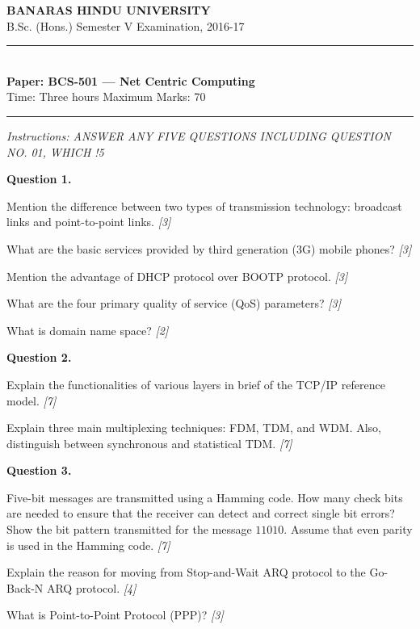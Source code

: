 \documentclass[11pt,a4paper]{article}
\newcommand{\pts}[1]{\hfill   \textit{[#1]}}
\begin{document}
\begin{center}
  {\large\bfseries BANARAS HINDU UNIVERSITY}\\[2pt]
  {\normalsize B.Sc. (Hons.) Semester V Examination, 2016-17}\\[6pt]
  \rule{0.8\linewidth}{0.5pt}\\[6pt]
  {\large\bfseries Paper: BCS-501 --- Net Centric Computing}\\[4pt]
  {\normalsize Time: Three hours \hfill Maximum Marks: 70}
\end{center}

\rule{\linewidth}{0.4pt}

\smallskip



\noindent   \textit{Instructions: ANSWER ANY FIVE QUESTIONS INCLUDING QUESTION NO. 01, WHICH !5}

\bigskip

\medskip


\noindent   \textbf{Question 1.}

\begin{parts}
  \item Mention the difference between two types of transmission technology: broadcast links and point-to-point links. \pts{3}
  \item What are the basic services provided by third generation (3G) mobile phones? \pts{3}
  \item Mention the advantage of DHCP protocol over BOOTP protocol. \pts{3}
  \item What are the four primary quality of service (QoS) parameters? \pts{3}
  \item What is domain name space? \pts{2}
\end{parts}

\medskip


\noindent   \textbf{Question 2.}

\begin{parts}
  \item Explain the functionalities of various layers in brief of the TCP/IP reference model. \pts{7}
  \item Explain three main multiplexing techniques: FDM, TDM, and WDM. Also, distinguish between synchronous and statistical TDM. \pts{7}
\end{parts}

\medskip


\noindent   \textbf{Question 3.}

\begin{parts}
  \item Five-bit messages are transmitted using a Hamming code. How many check bits are needed to ensure that the receiver can detect and correct single bit errors? Show the bit pattern transmitted for the message $11010$. Assume that even parity is used in the Hamming code. \pts{7}
  \item Explain the reason for moving from Stop-and-Wait ARQ protocol to the Go-Back-N ARQ protocol. \pts{4}
  \item What is Point-to-Point Protocol (PPP)? \pts{3}
\end{parts}
\end{document}
